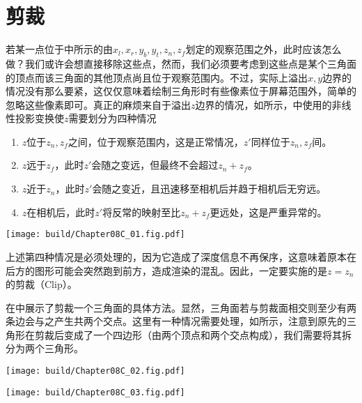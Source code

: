 \section{剪裁}

若某一点位于中所示的由$x_l,x_r,y_b,y_t,z_n,z_f$划定的观察范围之外，此时应该怎么做？我们或许会想直接移除这些点，然而，我们必须要考虑到这些点是某个三角面的顶点而该三角面的其他顶点尚且位于观察范围内。不过，实际上溢出$x,y$边界的情况没有那么要紧，这仅仅意味着绘制三角形时有些像素位于屏幕范围外，简单的忽略这些像素即可。真正的麻烦来自于溢出$z$边界的情况，如所示，中使用的非线性投影变换使$z$需要划分为四种情况
\begin{enumerate}
    \item $z$位于$z_n,z_f$之间，位于观察范围内，这是正常情况，$z'$同样位于$z_n,z_f$间。
    \item $z$远于$z_f$，此时$z'$会随之变远，但最终不会超过$z_n+z_f$。
    \item $z$近于$z_n$，此时$z'$会随之变近，且迅速移至相机后并趋于相机后无穷远。
    \item $z$在相机后，此时$z'$将反常的映射至比$z_n+z_f$更远处，这是严重异常的。
\end{enumerate}

\begin{Figure}
    \texttt{[image: build/Chapter08C\_01.fig.pdf]}
\end{Figure}


上述第四种情况是必须处理的，因为它造成了深度信息不再保序，这意味着原本在后方的图形可能会突然跑到前方，造成渲染的混乱。因此，一定要实施的是$z=z_n$的剪裁（Clip）。

在中展示了剪裁一个三角面的具体方法。显然，三角面若与剪裁面相交则至少有两条边会与之产生共两个交点。这里有一种情况需要处理，如所示，注意到原先的三角形在剪裁后变成了一个四边形（由两个顶点和两个交点构成），我们需要将其拆分为两个三角形。

\begin{Figure}[剪裁的方法]
    \begin{FigureSub}[情况1;剪裁情况1]
        \texttt{[image: build/Chapter08C\_02.fig.pdf]}
    \end{FigureSub}
    \hspace{0.5cm}
    \begin{FigureSub}[情况2;剪裁情况2]
        \texttt{[image: build/Chapter08C\_03.fig.pdf]}
    \end{FigureSub}
\end{Figure}